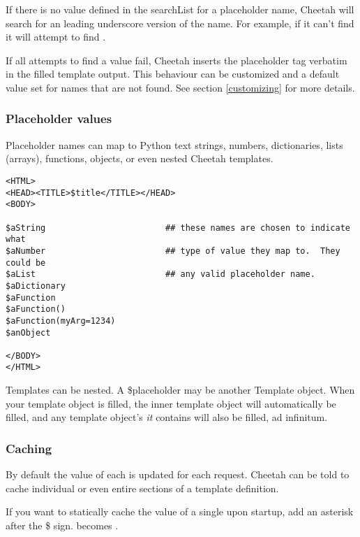 If there is no value defined in the searchList for a placeholder name,
Cheetah will search for an leading underscore version of the name.  For
example, if it can't find  it will attempt to find
.  

If all attempts to find a value fail, Cheetah inserts the placeholder tag
verbatim in the filled template output.  This behaviour can be customized and a
default value set for names that are not found.  See section
\ref{customizing} for more details.

\subsubsection{Placeholder values}
\label{TDL.placeholders.values}

Placeholder names can map to Python text strings, numbers, dictionaries, lists
(arrays), functions, objects, or even nested Cheetah templates.  

\begin{verbatim}
<HTML>
<HEAD><TITLE>$title</TITLE></HEAD>
<BODY>

$aString                        ## these names are chosen to indicate what
$aNumber                        ## type of value they map to.  They could be
$aList                          ## any valid placeholder name.
$aDictionary
$aFunction
$aFunction()
$aFunction(myArg=1234)
$anObject

</BODY>
</HTML>
\end{verbatim}

Templates can be nested.  A \$placeholder may be another Template object.  When
your template object is filled, the inner template object will automatically be
filled, and any template object's {\em it} contains will also be filled, ad
infinitum.

\subsubsection{Caching}
\label{TDL.placeholders.caching}

By default the value of each  is updated for each request.
Cheetah can be told to cache individual  or even entire
sections of a template definition.
                         
If you want to statically cache the value of a single  upon
startup, add an asterisk after the \$ sign.   becomes .

